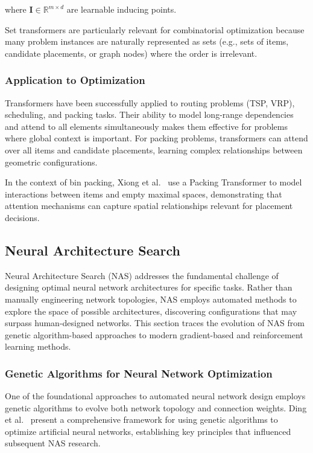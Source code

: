 where $\mathbf{I} \in \mathbb{R}^{m \times d}$ are learnable inducing points.

Set transformers are particularly relevant for combinatorial optimization because many problem instances are naturally represented as sets (e.g., sets of items, candidate placements, or graph nodes) where the order is irrelevant.

\subsubsection{Application to Optimization}

Transformers have been successfully applied to routing problems (TSP, VRP), scheduling, and packing tasks. Their ability to model long-range dependencies and attend to all elements simultaneously makes them effective for problems where global context is important. For packing problems, transformers can attend over all items and candidate placements, learning complex relationships between geometric configurations.

In the context of bin packing, Xiong et al.~\cite{xiong2024packing} use a Packing Transformer to model interactions between items and empty maximal spaces, demonstrating that attention mechanisms can capture spatial relationships relevant for placement decisions.

\subsection{Neural Architecture Search}

Neural Architecture Search (NAS) addresses the fundamental challenge of designing optimal neural network architectures for specific tasks. Rather than manually engineering network topologies, NAS employs automated methods to explore the space of possible architectures, discovering configurations that may surpass human-designed networks. This section traces the evolution of NAS from genetic algorithm-based approaches to modern gradient-based and reinforcement learning methods.

\subsubsection{Genetic Algorithms for Neural Network Optimization}

One of the foundational approaches to automated neural network design employs genetic algorithms to evolve both network topology and connection weights. Ding et al.~\cite{ding2010genetic} present a comprehensive framework for using genetic algorithms to optimize artificial neural networks, establishing key principles that influenced subsequent NAS research.

